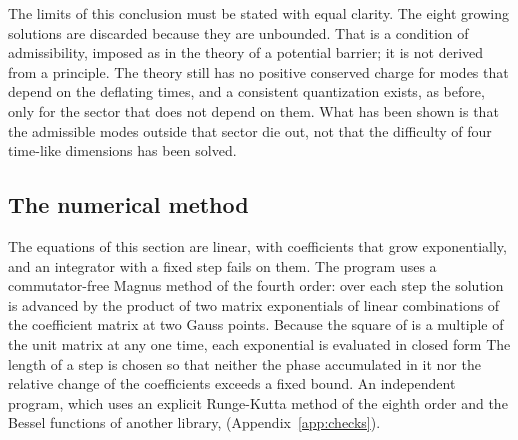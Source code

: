 The limits of this conclusion must be stated with equal clarity. The eight growing solutions are
discarded because they are unbounded. That is a condition of admissibility, imposed as in the theory
of a potential barrier; it is not derived from a principle. The theory still has no positive
conserved charge for modes that depend on the deflating times, and a consistent quantization exists,
as before, only for the sector that does not depend on them. What has been shown is that the
admissible modes outside that sector die out, not that the difficulty of four time-like dimensions
has been solved.

\subsection{The numerical method}

The equations of this section are linear, with coefficients that grow exponentially, and an
integrator with a fixed step fails on them. The program uses a commutator-free Magnus method of the
fourth order: over each step the solution is advanced by the product of two matrix exponentials of
linear combinations of the coefficient matrix at two Gauss points. Because the square of
 is a multiple of the unit matrix at any one time, each exponential is evaluated in
closed form The length of a step is chosen so that
neither the phase accumulated in it nor the relative change of the coefficients exceeds a fixed
bound. An independent program,
which uses an explicit Runge-Kutta method of the eighth order and the Bessel functions of another
library,  (Appendix~\ref{app:checks}).

